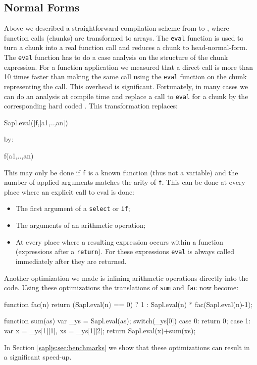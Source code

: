 \subsection{Normal Forms}
Above we described a straightforward compilation scheme from \Sapl to \JS, 
where function calls (chunks) are transformed to arrays.
The \texttt{eval} function is used to turn a chunk into a real \JS function call and reduces a chunk to head-normal-form.
The \texttt{eval} function has to do a case analysis on the structure of the chunk expression.
For a function application  we measured that a direct \JS call is more than 10 times faster 
than making the same call using the 
\texttt{eval} function on the chunk representing the call. This overhead is significant. 
Fortunately, in many cases we can do an analysis at compile time and replace a call to \texttt{eval} for a chunk by the corresponding hard coded \JS.
This transformation replaces:
\begin{CleanCode}
Sapl.eval([f,[a1,..,an])
\end{CleanCode}
by:
\begin{CleanCode}
f(a1,..,an)
\end{CleanCode}
This may only be done if \texttt{f} is a known function (thus not a variable) and the number of applied arguments matches the
arity of \texttt{f}.
This can be done at every place where an explicit call to \textsf{eval} is done:
\begin{itemize}
\item The first argument of a \texttt{select} or \texttt{if};
\item The arguments of an arithmetic operation;
\item At every place where a resulting expression occurs within a \JS function (expressions after a \texttt{return}).
For these expressions  \texttt{eval} is always called immediately after they are returned.
\end{itemize}
Another optimization we made is inlining arithmetic operations directly into the code.
Using these optimizations the translations of \texttt{sum} and \texttt{fac} now become:
\begin{CleanCode}
function fac(n){
	return (Sapl.eval(n) == 0) ? 1 : Sapl.eval(n) * fac(Sapl.eval(n)-1);
}

function sum(as){
	var _ys = Sapl.eval(as);
	switch(_ys[0]){
		case 0: return 0;
		case 1: var x = _ys[1][1], xs = _ys[1][2]; 
		        return Sapl.eval(x)+sum(xs);
	}
}
\end{CleanCode}
In Section \ref{sapljs:sec:benchmarks} we show that these optimizations can result in 
a significant speed-up.

